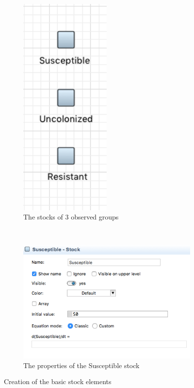 \begin{figure}[!ht]
    \centering
    \begin{subfigure}[b]{0.3\textwidth}
        \includegraphics[width=0.5\textwidth]{img/screens/basic/basic4}
        \caption{The stocks of 3 observed groups}
    \end{subfigure}
    ~ %
    \begin{subfigure}[b]{0.6\textwidth}
        \includegraphics[width=\textwidth]{img/screens/basic/basic3}
        \caption{The properties of the Susceptible stock}
    \end{subfigure}
    \caption{Creation of the basic stock elements}
\end{figure}

